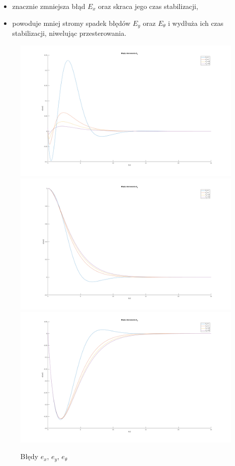 \documentclass[12pt,a4paper]{article}
\begin{document}
  \begin{itemize}
    \item znacznie zmniejsza błąd $E_x$ oraz skraca jego czas stabilizacji,
    \item powoduje mniej stromy spadek błędów $E_y$ oraz $E_\theta$ i wydłuża ich czas stabilizacji, niwelując przesterowania.
  \end{itemize}
  
  \begin{figure}[H]
    \centering
    \includegraphics[height=0.3\textheight]{figures/dyn_bledy_k1_ex.png}
    \includegraphics[height=0.3\textheight]{figures/dyn_bledy_k1_ey.png}
    \includegraphics[height=0.3\textheight]{figures/dyn_bledy_k1_eo.png}
    \caption{Błędy $e_x$, $e_y$, $e_\theta$}
    \label{fig:5}
  \end{figure}
\end{document}
